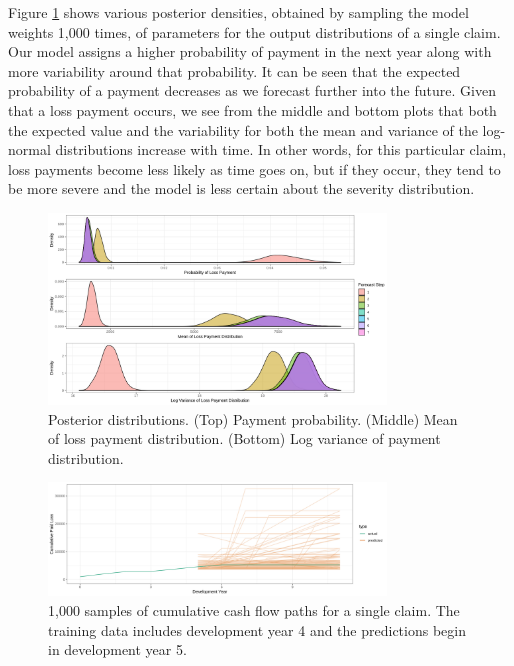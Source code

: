 \documentclass{article}
\begin{document}
Figure \ref{fig:prob_cash_flows} shows various posterior densities, obtained by
sampling the model weights 1,000 times, of parameters for the output 
distributions of a single claim. Our model assigns a higher probability of 
payment in the next year along with more variability around that probability. 
It can be seen that the expected probability of a payment decreases as we 
forecast further into the future. Given that a loss payment occurs, we see from
the middle and bottom plots that both the expected value and the variability for
both the mean and variance of the log-normal distributions increase with time. 
In other words, for this particular claim, loss payments become less likely as 
time goes on, but if they occur, they tend to be more severe and the model is 
less certain about the severity distribution.

\begin{figure}
  \begin{center}
    \includegraphics[width=0.8\textwidth]{images/posteriors.png}
  \end{center}
  \caption{Posterior distributions. (Top) Payment probability. (Middle) Mean of
  loss payment distribution. (Bottom) Log variance of payment distribution.}
  \label{fig:prob_cash_flows}
\end{figure}

\begin{figure}
  \begin{center}
    \includegraphics[width=0.8\textwidth]{images/claim_paths.png}
  \end{center}
  \caption{1,000 samples of cumulative cash flow paths for a single claim. The 
  training data includes development year 4 and the predictions begin in development year 5.}
  \label{fig:claim_paths}
\end{figure}
\end{document}
